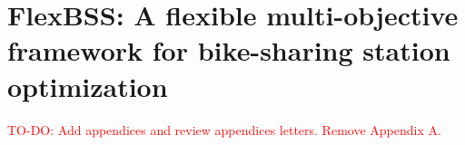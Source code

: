 \chapter{FlexBSS: A flexible multi-objective framework for bike-sharing station optimization}

\textcolor{red}{TO-DO: Add appendices and review appendices letters. Remove Appendix A.}


